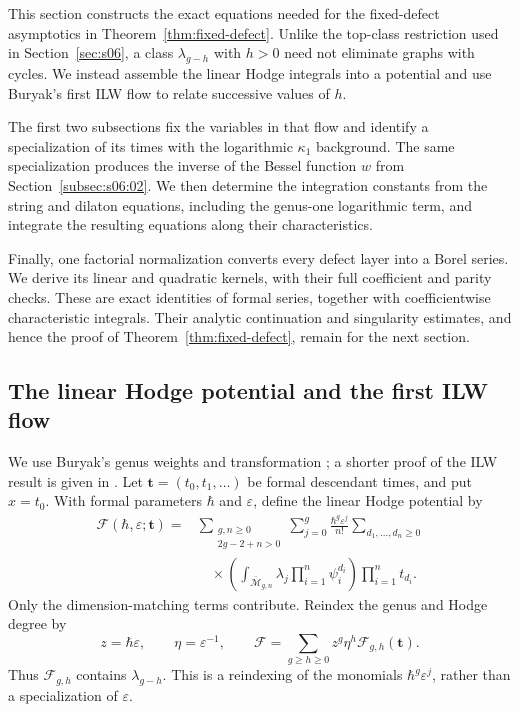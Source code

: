 \documentclass[a4paper,10pt]{article}
\numberwithin{equation}{section}
\newcommand{\MM}{\overline{\mathcal{M}}}
\theoremstyle{paperplain}
\theoremstyle{paperremark}
\theoremstyle{paperplain}
\begin{document}
This section constructs the exact equations needed for the fixed-defect
asymptotics in Theorem~\ref{thm:fixed-defect}. Unlike the top-class
restriction used in Section~\ref{sec:s06}, a class $\lambda_{g-h}$ with
$h>0$ need not eliminate graphs with cycles. We instead assemble the
linear Hodge integrals into a potential and use Buryak's first ILW flow
to relate successive values of $h$.

The first two subsections fix the variables in that flow and identify a
specialization of its times with the logarithmic $\kappa_1$ background.
The same specialization produces the inverse of the Bessel function
$w$ from Section~\ref{subsec:s06:02}. We then determine the integration
constants from the string and dilaton equations, including the
genus-one logarithmic term, and integrate the resulting equations along
their characteristics.

Finally, one factorial normalization converts every defect layer into a
Borel series. We derive its linear and quadratic kernels, with their
full coefficient and parity checks. These are exact identities of
formal series, together with coefficientwise characteristic integrals.
Their analytic continuation and singularity estimates, and hence the
proof of Theorem~\ref{thm:fixed-defect}, remain for the next section.

\subsection{The linear Hodge potential and the first ILW flow}
\label{subsec:s07:01}

We use Buryak's genus weights and transformation
\cite[Theorem~1.1, (1.1)--(1.2)]{Bur15}; a shorter proof of the
ILW result is given in \cite[Theorem~1.1 and Section~2]{Bur16}.
Let $\mathbf t=(t_0,t_1,\ldots)$ be formal descendant times, and put
$x=t_0$. With formal parameters $\hbar$ and $\varepsilon$, define the
linear Hodge potential by
\begin{equation}\label{eq:s07:hodge-potential}
 \begin{aligned}
 \mathcal F(\hbar,\varepsilon;\mathbf t)
 ={}&\sum_{\substack{g,n\geq0\\2g-2+n>0}}
   \sum_{j=0}^g\frac{\hbar^g\varepsilon^j}{n!}
   \sum_{d_1,\ldots,d_n\geq0}\\
 &\quad\times
   \left(\int_{\MM_{g,n}}\lambda_j
                    \prod_{i=1}^n\psi_i^{d_i}\right)
   \prod_{i=1}^n t_{d_i}.
 \end{aligned}
\end{equation}
Only the dimension-matching terms contribute. Reindex the genus and
Hodge degree by
\begin{equation}\label{eq:s07:defect-variables}
 z=\hbar\varepsilon,\qquad \eta=\varepsilon^{-1},\qquad
 \mathcal F=\sum_{g\geq h\geq0}z^g\eta^h
                         \mathcal F_{g,h}(\mathbf t).
\end{equation}
Thus $\mathcal F_{g,h}$ contains $\lambda_{g-h}$. This is a reindexing
of the monomials $\hbar^g\varepsilon^j$, rather than a specialization
of $\varepsilon$.
\end{document}
